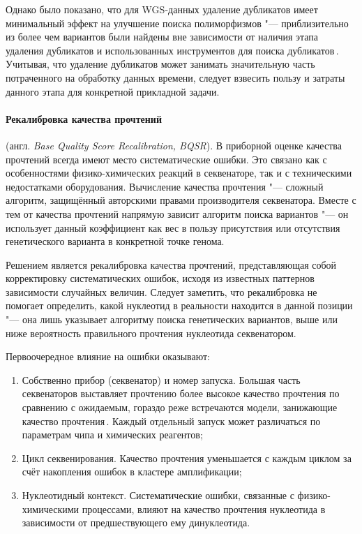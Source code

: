 \documentclass[a4paper,14pt]{extarticle}
\newcommand{\mln}{млн}
\newcommand{\engterm}[1]{англ. \textenglish{\textit{#1}}}
\begin{document}
Однако было показано, что для WGS-данных удаление дубликатов имеет минимальный эффект на улучшение поиска полиморфизмов "--- приблизительно  из более чем \numprint[\mln]{17} вариантов были найдены вне зависимости от наличия этапа удаления дубликатов и использованных инструментов для поиска дубликатов\,\citep{Ebbert_2016}.
Учитывая, что удаление дубликатов может занимать значительную часть потраченного на обработку данных времени, следует взвесить пользу и затраты данного этапа для конкретной прикладной задачи.

\paragraph{Рекалибровка качества прочтений} (\engterm{Base Quality Score Recalibration, BQSR}).
В приборной оценке качества прочтений всегда имеют место систематические ошибки.
Это связано как с особенностями физико-химических реакций в секвенаторе, так и с техническими недостатками оборудования.
Вычисление качества прочтения "--- сложный алгоритм, защищённый авторскими правами производителя секвенатора.
Вместе с тем от качества прочтений напрямую зависит алгоритм поиска вариантов "--- он использует данный коэффициент как вес в пользу присутствия или отсутствия генетического варианта в конкретной точке генома.

Решением является рекалибровка качества прочтений, представляющая собой корректировку систематических ошибок, исходя из известных паттернов зависимости случайных величин.
Следует заметить, что рекалибровка не помогает определить, какой нуклеотид в реальности находится в данной позиции "--- она лишь указывает алгоритму поиска генетических вариантов, выше или ниже вероятность правильного прочтения нуклеотида секвенатором.

Первоочередное влияние на ошибки оказывают:

\begin{enumerate}
	\item Собственно прибор (секвенатор) и номер запуска.
	      Большая часть секвенаторов выставляет прочтению более высокое качество прочтения по сравнению с ожидаемым, гораздо реже встречаются модели, занижающие качество прочтения\,\citep{Auwera_2013}.
	      Каждый отдельный запуск может различаться по параметрам чипа и химических реагентов;
	\item Цикл секвенирования.
	      Качество прочтения уменьшается с каждым циклом за счёт накопления ошибок в кластере амплификации;
	\item Нуклеотидный контекст.
	      Систематические ошибки, связанные с физико-химическими процессами, влияют на качество прочтения нуклеотида в зависимости от предшествующего ему динуклеотида.
\end{enumerate}
\end{document}
